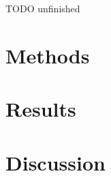 TODO unfinished

\section{Methods}
\lipsum[3]

\section{Results}
\lipsum[4]

\section{Discussion}
\lipsum[5]

\printbibliography[heading=bibnumbered]

